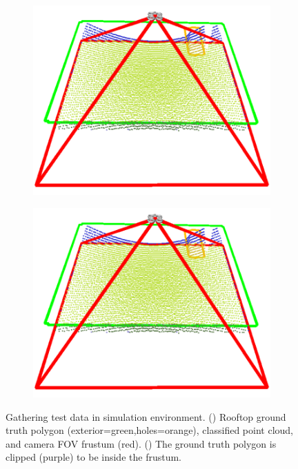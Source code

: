 \begin{figure}[ht]
 \centering
  \begin{subfigure}{.40\linewidth}
    \centering\includegraphics[page=1, width=.99\linewidth]{chapter_6_landingsim/figs/GroundTruthClipping.pdf}
    \caption{\label{fig:ch6_clipping_a}}
  \end{subfigure}
  \begin{subfigure}{.40\linewidth}
    \centering\includegraphics[page=2, width=.99\linewidth]{chapter_6_landingsim/figs/GroundTruthClipping.pdf}
    \caption{\label{fig:ch6_clipping_b}}
  \end{subfigure}
  \caption[Gathering test data in simulation environment]{Gathering test data in simulation environment. () Rooftop ground truth polygon (exterior=green,holes=orange), classified point cloud, and camera FOV frustum (red). () The ground truth polygon is clipped (purple) to be inside the frustum.}\label{fig:ch6_clipping}
\end{figure}



